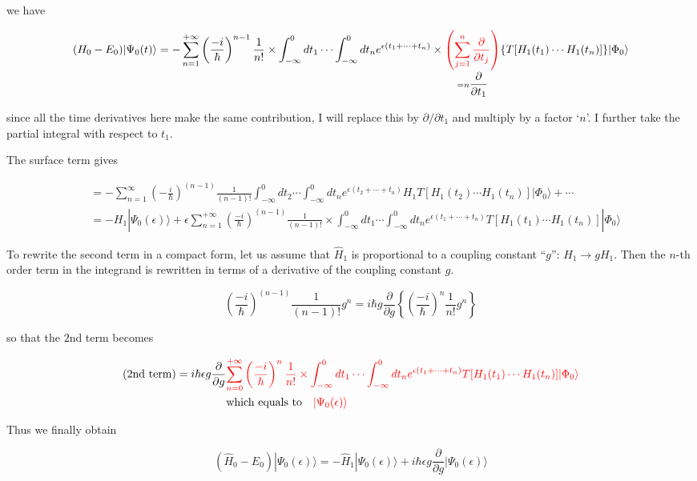 we have

\[(H_0-E_0)|\Psi_0(t)\rangle = -\sum_{n=1}^{+\infty}\left(\frac{-i}{\hbar}\right)^{n-1}\frac{1}{n!}\times\int_{-\infty}^0dt_1\cdots\int_{-\infty}^0dt_n e^{\epsilon(t_1+\cdots+t_n)}\times\underset{=n\displaystyle\frac{\partial}{\partial t_1}}{{\color{red}{\left(\sum_{j=1}^n\frac{\partial}{\partial t_j}\right)}}}
\{T[H_1(t_1)\cdots H_1(t_n)]\}|\Phi_0\rangle \]

since all the time derivatives here make the same contribution, I will replace this by $\partial/\partial t_1$ and multiply by a factor `$n$'. I further take the partial integral with respect to $t_1$. 

The surface term gives

\[\begin{split}
&=-\sum_{n=1}^{\infty}\left(-\frac{i}{\hbar}\right)^{(n-1)}\frac{1}{(n-1)!}\int_{-\infty}^0 dt_2\cdots\int_{-\infty}^0 dt_n e^{\epsilon(t_2+\cdots+t_n)}H_1T[H_1(t_2)\cdots H_1(t_n)]|\Phi_0\rangle + \cdots\\
&=-H_1|\Psi_0(\epsilon)\rangle + \epsilon\sum_{n=1}^{+\infty}\left(\frac{-i}{\hbar}\right)^{(n-1)}\frac{1}{(n-1)!}\times \int_{-\infty}^0 dt_1\cdots\int_{-\infty}^0 dt_n e^{\epsilon(t_1+\cdots+t_n)}T[H_1(t_1)\cdots H_1(t_n)]|\Phi_0\rangle
\end{split}\]


To rewrite the second term in a compact form, let us assume that $\hat{H}_1$ is proportional to a coupling constant ``$g$'': $H_1\to gH_1$. Then the $n$-th order term in the integrand is rewritten in terms of a derivative of the coupling constant $g$. 

\[\left(\frac{-i}{\hbar}\right)^{(n-1)}\frac{1}{(n-1)!}g^n=i\hbar g\frac{\partial}{\partial g}\left\{\left(\frac{-i}{\hbar}\right)^n\frac{1}{n!}g^n\right\} \]

so that the $2$nd term becomes

\[\begin{split}
(2\text{nd term}) = i\hbar\epsilon g\frac{\partial}{\partial g} &{\color{red}{\sum_{n=0}^{+\infty}\left(\frac{-i}{\hbar}\right)^n\frac{1}{n!}\times \int_{-\infty}^0 dt_1\cdots \int_{-\infty}^0 dt_n e^{\epsilon(t_1+\cdots+t_n)}T[H_1(t_1)\cdots H_1(t_n)]|\Phi_0\rangle}}\\
&{\text{which equals to}} \quad {\color{red}{|\Psi_0(\epsilon)\rangle}}
\end{split}\]

Thus we finally obtain 

\[(\hat{H}_0-E_0)|\Psi_0(\epsilon)\rangle = -\hat{H}_1|\Psi_0(\epsilon)\rangle + i\hbar\epsilon g\frac{\partial}{\partial g}|\Psi_0(\epsilon)\rangle \]

